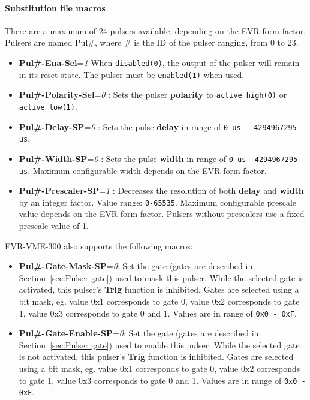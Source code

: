 \documentclass[12pt,a4paper]{article}
\begin{document}
\paragraph{Substitution file macros}
There are a maximum of 24 pulsers available, depending on the EVR form factor. Pulsers are named Pul\#, where \# is the ID of the pulser ranging, from 0 to 23.
\begin{itemize}
  \item
    \textbf{Pul\#-Ena-Sel}=\emph{1} When \texttt{disabled(0)}, the output of the pulser will remain in its reset state. The pulser must be \texttt{enabled(1)} when used.
  \item
    \textbf{Pul\#-Polarity-Sel}=\emph{0} : Sets the pulser \textbf{polarity} to \texttt{active high(0)} or \texttt{active low(1)}.
  \item
    \textbf{Pul\#-Delay-SP}=\emph{0} : Sets the pulse \textbf{delay} in range of \texttt{0 us - 4294967295 us}.
  \item
    \textbf{Pul\#-Width-SP}=\emph{0} : Sets the pulse \textbf{width} in range of \texttt{0 us- 4294967295 us}. Maximum configurable width depends on the EVR form factor.
  \item
    \textbf{Pul\#-Prescaler-SP}=\emph{1} : Decreases the resolution of both \textbf{delay} and \textbf{width} by an integer factor. Value range: \texttt{0-65535}. Maximum configurable prescale value depends on the EVR form factor. Pulsers without prescalers use a fixed prescale value of 1.
  \end{itemize}
EVR-VME-300 also supports the following macros:
\begin{itemize}
  \item
    \textbf{Pul\#-Gate-Mask-SP}=\emph{0}: Set the gate (gates are described in Section~\ref{sec:Pulser gate}) used to mask this pulser. While the selected gate is activated, this pulser's \textbf{Trig} function is inhibited. Gates are selected using a bit mask, eg. value 0x1 corresponds to gate 0, value 0x2 corresponds to gate 1, value 0x3 corresponds to gate 0 and 1. Values are in range of \texttt{0x0 - 0xF}.
  \item
     \textbf{Pul\#-Gate-Enable-SP}=\emph{0}: Set the gate (gates are described in Section~\ref{sec:Pulser gate}) used to enable this pulser. While the selected gate is not activated, this pulser's \textbf{Trig} function is inhibited. Gates are selected using a bit mask, eg. value 0x1 corresponds to gate 0, value 0x2 corresponds to gate 1, value 0x3 corresponds to gate 0 and 1. Values are in range of \texttt{0x0 - 0xF}.
  \end{itemize}
\end{document}
